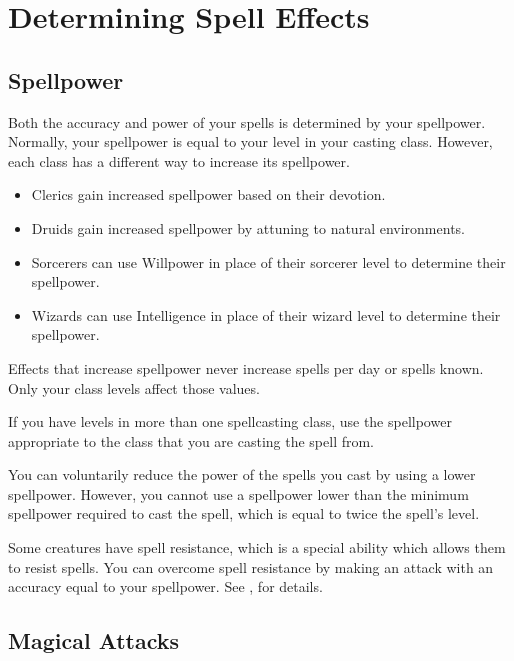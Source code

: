 \section{Determining Spell Effects}

\subsection{Spellpower}

Both the accuracy and power of your spells is determined by your spellpower. Normally, your spellpower is equal to your level in your casting class. However, each class has a different way to increase its spellpower.

\begin{itemize}
    \item Clerics gain increased spellpower based on their devotion.
    \item Druids gain increased spellpower by attuning to natural environments.
    \item Sorcerers can use Willpower in place of their sorcerer level to determine their spellpower.
    \item Wizards can use Intelligence in place of their wizard level to determine their spellpower.
\end{itemize}

Effects that increase spellpower never increase spells per day or spells known. Only your class levels affect those values.

 If you have levels in more than one spellcasting class, use the spellpower appropriate to the class that you are casting the spell from.

 You can voluntarily reduce the power of the spells you cast by using a lower spellpower. However, you cannot use a spellpower lower than the minimum spellpower required to cast the spell, which is equal to twice the spell's level.

 Some creatures have spell resistance, which is a special ability which allows them to resist spells. You can overcome spell resistance by making an attack with an accuracy equal to your spellpower. See , for details.

\subsection{Magical Attacks}

